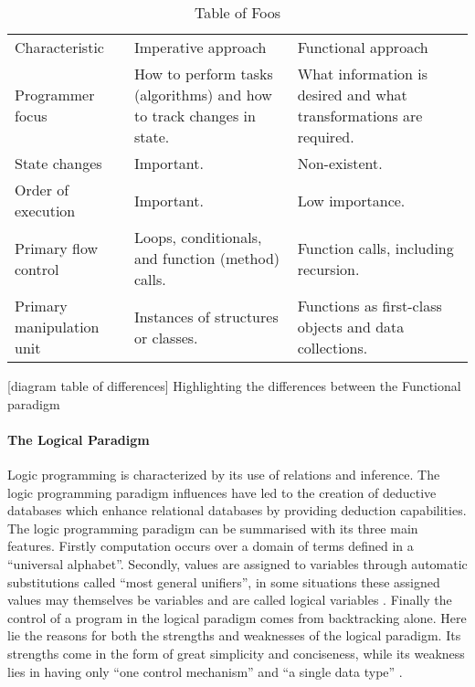 \documentclass[main.tex]{subfiles}
\begin{document}
\begin{table}
\begin{center}
	\begin{tabular}{lll}
		Characteristic & Imperative approach & Functional approach \\
		Programmer focus & How to perform tasks (algorithms) and how to track changes in state. & What information is desired and what transformations are required. \\
		State changes & Important. & Non-existent. \\
                Order of execution & Important. & Low importance. \\
                Primary flow control & Loops, conditionals, and function (method) calls. & Function calls, including recursion. \\
                Primary manipulation unit & Instances of structures or classes. & Functions as first-class objects and data collections. \\
	\end{tabular}
	\caption{Table of Foos}
	\label{tab:foo}
\end{center}
\end{table}

[diagram table of differences]
Highlighting the differences between the Functional paradigm
\cite{Microsoft2010}

\paragraph{The Logical Paradigm} %
Logic programming is characterized by its use of relations and inference.\cite{Aaby1996} The logic programming paradigm influences have led to the creation of deductive databases which enhance relational databases by providing deduction capabilities. The logic programming paradigm can be summarised with its three main features. Firstly computation occurs over a domain of terms defined in a ``universal alphabet''. Secondly, values are assigned to variables through automatic substitutions called ``most general unifiers'', in some situations these assigned values may themselves be variables and are called logical variables \cite{Apt2001}. Finally the control of a program in the logical paradigm comes from backtracking alone. Here lie the reasons for both the strengths and weaknesses of the logical paradigm. Its strengths come in the form of great simplicity and conciseness, while its weakness lies in having only ``one control mechanism'' and ``a single data type'' \cite{Apt2001}.
\end{document}
